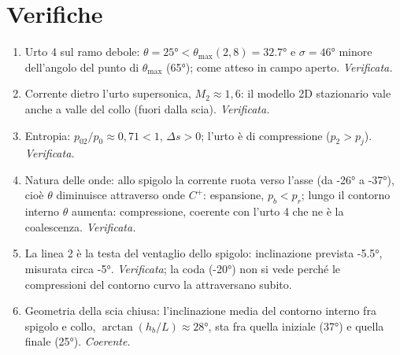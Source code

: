 \documentclass[11pt,a4paper]{article}
\newcommand{\Cp}{C^{+}}
\begin{document}
\section{Verifiche}
\begin{enumerate}
\item Urto 4 sul ramo debole: $\theta=\ang{25}<\theta_{\max}(2{,}8)=\ang{32.7}$ e $\sigma=\ang{46}$ minore dell'angolo
  del punto di $\theta_{\max}$ (\ang{65}); come atteso in campo aperto. \emph{Verificata.}
\item Corrente dietro l'urto supersonica, $M_2\approx1{,}6$: il modello 2D stazionario vale anche a valle del collo
  (fuori dalla scia). \emph{Verificata.}
\item Entropia: $p_{02}/p_0\approx0{,}71<1$, $\Delta s>0$; l'urto è di compressione ($p_2>p_j$). \emph{Verificata.}
\item Natura delle onde: allo spigolo la corrente ruota verso l'asse (da \ang{-26} a \ang{-37}), cioè $\theta$
  diminuisce attraverso onde $\Cp$: espansione, $p_b<p_r$; lungo il contorno interno $\theta$ aumenta: compressione,
  coerente con l'urto 4 che ne è la coalescenza. \emph{Verificata.}
\item La linea 2 è la testa del ventaglio dello spigolo: inclinazione prevista \ang{-5.5}, misurata circa \ang{-5}.
  \emph{Verificata}; la coda (\ang{-20}) non si vede perché le compressioni del contorno curvo la attraversano subito.
\item Geometria della scia chiusa: l'inclinazione media del contorno interno fra spigolo e collo,
  $\arctan(h_b/L)\approx\ang{28}$, sta fra quella iniziale (\ang{37}) e quella finale (\ang{25}).
  \emph{Coerente.}
\end{enumerate}

\end{document}
